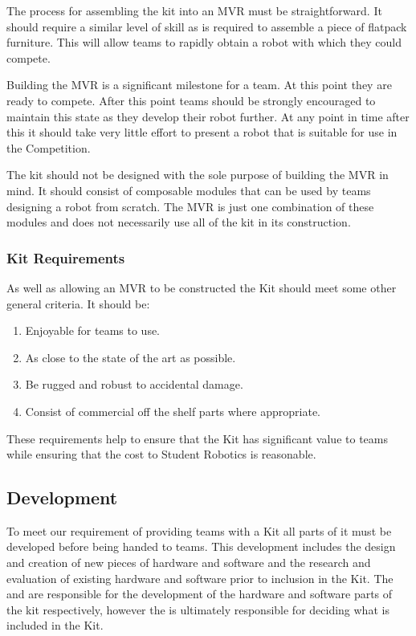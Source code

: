 \begin{draft}
The process for assembling the kit into an MVR must be straightforward. It should require a similar level of skill as is required to assemble a piece of flatpack furniture. This will allow teams to rapidly obtain a robot with which they could compete.

Building the MVR is a significant milestone for a team. At this point they are ready to compete. After this point teams should be strongly encouraged to maintain this state as they develop their robot further. At any point in time after this it should take very little effort to present a robot that is suitable for use in the Competition.

The kit should not be designed with the sole purpose of building the MVR in mind. It should consist of composable modules that can be used by teams designing a robot from scratch. The MVR is just one combination of these modules and does not necessarily use all of the kit in its construction.

\subsubsection{Kit Requirements}

As well as allowing an MVR to be constructed the Kit should meet some other general criteria. It should be:

\begin{enumerate}
  \item Enjoyable for teams to use.
  \item As close to the state of the art as possible.
  \item Be rugged and robust to accidental damage.
  \item Consist of commercial off the shelf parts where appropriate.
\end{enumerate}

These requirements help to ensure that the Kit has significant value to teams while ensuring that the cost to Student Robotics is reasonable.

\subsection{Development}

To meet our requirement of providing teams with a Kit all parts of it must be developed before being handed to teams. This development includes the design and creation of new pieces of hardware and software and the research and evaluation of existing hardware and software prior to inclusion in the Kit. The  and  are responsible for the development of the hardware and software parts of the kit respectively, however the  is ultimately responsible for deciding what is included in the Kit.


\end{draft}
